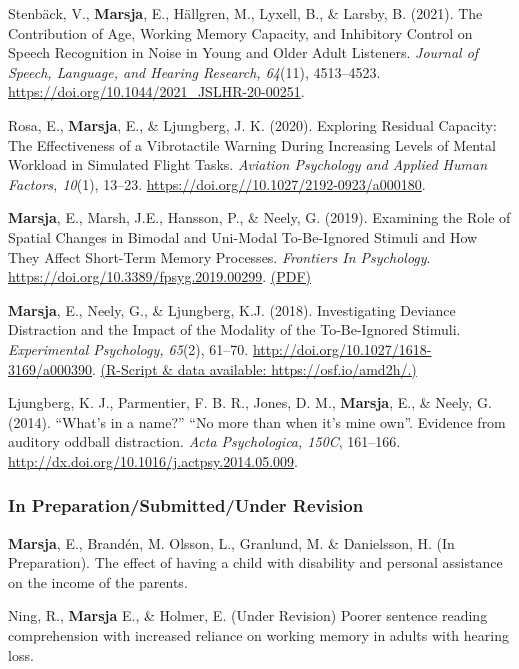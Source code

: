 \documentclass[]{article}
\begin{document}
Stenbäck, V., \textbf{Marsja}, E., Hällgren, M., Lyxell, B., \& Larsby,
B. (2021). The Contribution of Age, Working Memory Capacity, and
Inhibitory Control on Speech Recognition in Noise in Young and Older
Adult Listeners. \emph{Journal of Speech, Language, and Hearing
Research, 64}(11), 4513--4523.
\url{https://doi.org/10.1044/2021_JSLHR-20-00251}.

Rosa, E., \textbf{Marsja}, E., \& Ljungberg, J. K. (2020). Exploring
Residual Capacity: The Effectiveness of a Vibrotactile Warning During
Increasing Levels of Mental Workload in Simulated Flight Tasks.
\emph{Aviation Psychology and Applied Human Factors, 10}(1), 13--23.
\url{https://doi.org//10.1027/2192-0923/a000180}.

\textbf{Marsja}, E., Marsh, J.E., Hansson, P., \& Neely, G. (2019).
Examining the Role of Spatial Changes in Bimodal and Uni-Modal
To-Be-Ignored Stimuli and How They Affect Short-Term Memory Processes.
\emph{Frontiers In Psychology}.
\url{https://doi.org/10.3389/fpsyg.2019.00299}.
\href{https://bit.ly/3LkKD19}{(PDF)}

\textbf{Marsja}, E., Neely, G., \& Ljungberg, K.J. (2018). Investigating
Deviance Distraction and the Impact of the Modality of the To-Be-Ignored
Stimuli. \emph{Experimental Psychology, 65}(2), 61--70.
\url{http://doi.org/10.1027/1618-3169/a000390}.
\href{https://osf.io/amd2h/}{(R-Script \& data available:
https://osf.io/amd2h/.)}

Ljungberg, K. J., Parmentier, F. B. R., Jones, D. M., \textbf{Marsja},
E., \& Neely, G. (2014). ``What's in a name?'' ``No more than when it's
mine own''. Evidence from auditory oddball distraction. \emph{Acta
Psychologica, 150C}, 161--166.
\href{http://doi.org/10.1027/1618-3169/a000390}{http://dx.doi.org/10.1016/j.actpsy.2014.05.009}.

\subsubsection{In Preparation/Submitted/Under
Revision}\label{in-preparationsubmittedunder-revision}

\textbf{Marsja}, E., Brandén, M. Olsson, L., Granlund, M. \& Danielsson,
H. (In Preparation). The effect of having a child with disability and
personal assistance on the income of the parents.

Ning, R., \textbf{Marsja} E., \& Holmer, E. (Under Revision) Poorer
sentence reading comprehension with increased reliance on working memory
in adults with hearing loss.
\end{document}
